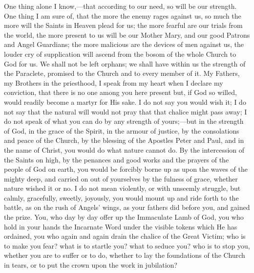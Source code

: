 One thing alone I know,—that according to our
need, so will be our strength. One thing I am sure of,
that the more the enemy rages against us, so much the
more will the Saints in Heaven plead for us; the more
fearful are our trials from the world, the more present
to us will be our Mother Mary, and our good Patrons and
Angel Guardians; the more malicious are the devices of
men against us, the louder cry of supplication will
ascend from the bosom of the whole Church to God for us.
We shall not be left orphans; we shall have within us the
strength of the Paraclete, promised to the Church and to
every member of it. My Fathers, my Brothers in the
priesthood, I speak from my heart when I declare my
conviction, that there is no one among you here present
but, if God so willed, would readily become a martyr for
His sake. I do not say you would wish it; I do not say
that the natural will would not pray that that chalice
might pass away; I do not speak of what you can do by any
strength of yours;—but in the strength of God, in
the grace of the Spirit, in the armour of justice, by the
consolations and peace of the Church, by the blessing of
the Apostles Peter and Paul, and in the name of Christ,
you would do what nature cannot do. By the intercession
of the Saints on high, by the penances and good works and
the prayers of the people of God on earth, you would be
forcibly borne up as upon the waves of the mighty deep,
and carried on out of yourselves by the fulness of grace,
whether nature wished it or no. I do not mean violently,
or with unseemly struggle, but calmly, gracefully,
sweetly, joyously, you would mount up and ride forth to
the battle, as on the rush of Angels' wings, as your
fathers did before you, and gained the prize. You, who
day by day offer up the Immaculate Lamb of God, you who
hold in your hands the Incarnate Word under the visible
tokens which He has ordained, you who again and again
drain the chalice of the Great Victim; who is to make you
fear? what is to startle you? what to seduce you? who is
to stop you, whether you are to suffer or to do, whether
to lay the foundations of the Church in tears, or to put
the crown upon the work in jubilation?

